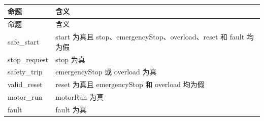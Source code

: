 \begin{longtable}{L{3.3cm}L{10.0cm}}

\toprule

命题 & 含义\\

\midrule

\endfirsthead

\toprule

命题 & 含义\\

\midrule

\endhead

{\ttfamily safe\_start} & start 为真且 stop、emergencyStop、overload、reset 和 fault 均为假\\

{\ttfamily stop\_request} & stop 为真\\

{\ttfamily safety\_trip} & emergencyStop 或 overload 为真\\

{\ttfamily valid\_reset} & reset 为真且 emergencyStop 和 overload 均为假\\

{\ttfamily motor\_run} & motorRun 为真\\

{\ttfamily fault} & fault 为真\\

\bottomrule

\end{longtable}

